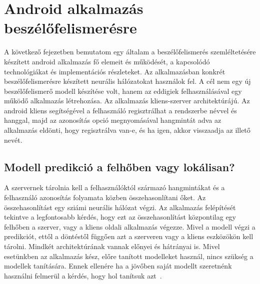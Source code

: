 \chapter{Android alkalmazás beszélőfelismerésre}

A következő fejezetben bemutatom egy általam a beszélőfelismerés szemléltetésére készített android alkalmazás fő elemeit és működését, a kapcsolódó technológiákat és implementációs részleteket. Az alkalmazásban konkrét beszélőfelismerésre készített neurális hálózatokat használok fel. A cél nem egy új beszélőfelismerő modell készítése volt, hanem az eddigiek felhasználásával egy működő alkalmazás létrehozása.
\newline
\newline
Az alkalmazás kliens-szerver architektúrájú. Az android kliens segítségével a felhasználó regisztrálhat a rendszerbe névvel és hanggal, majd az azonosítás opció megnyomásával hangmintát adva az alkalmazás eldönti, hogy regisztrálva van-e, és ha igen, akkor visszaadja az illető nevét.

\section{Modell predikció a felhőben vagy lokálisan?} \label{cloud_or_local}


A szervernek tárolnia kell a felhasználóktól származó hangmintákat és a felhasználó azonosítás folyamata közben összehasonlítani őket. Az összehasonlítást egy sziámi neurális hálózat végzi. Az alkalmazás felépítését tekintve a legfontosabb kérdés, hogy ezt az összehasonlítást központilag egy felhőben a szerver, vagy a kliens oldali alkalmazás végezze. Mivel a modell végzi a predikciót, ettől a döntéstől függően azt a szerveren vagy a kliens eszközökön kell tárolni. Mindkét architektúrának vannak előnyei és hátrányai is.
\newline
\newline
Mivel esetünkben az alkalmazás kész, előre tanított modelleket használ, nincs szükség a modellek tanítására. Ennek ellenére ha a jövőben saját modellt szeretnénk használni felmerül a kérdés, hogy hol tanítsuk azt~\cite{cloud_or_local}.

